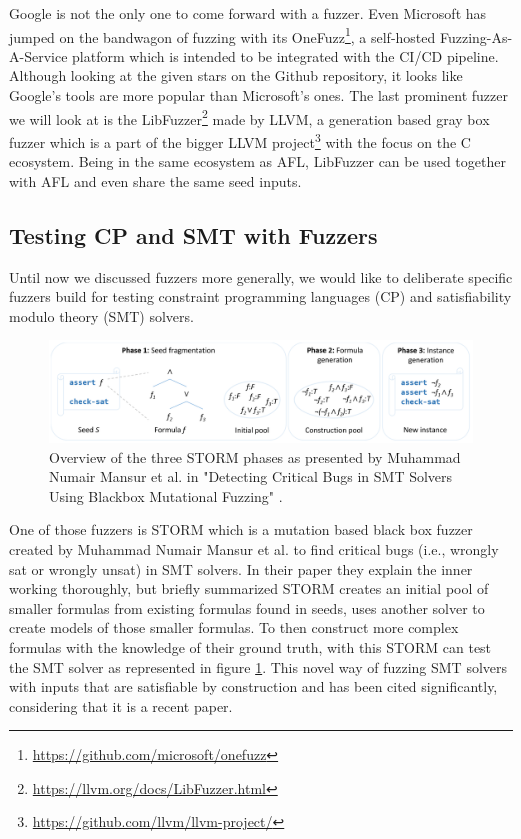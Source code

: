 Google is not the only one to come forward with a fuzzer. Even Microsoft has jumped on the bandwagon of fuzzing with its OneFuzz\footnote{\url{https://github.com/microsoft/onefuzz}}, a self-hosted Fuzzing-As-A-Service platform which is intended to be integrated with the CI/CD pipeline. Although looking at the given stars on the Github repository, it looks like Google's tools are more popular than Microsoft's ones. The last prominent fuzzer we will look at is the LibFuzzer\footnote{\url{https://llvm.org/docs/LibFuzzer.html}} made by LLVM, a generation based gray box fuzzer which is a part of the bigger LLVM project\footnote{\url{https://github.com/llvm/llvm-project/}} with the focus on the C ecosystem. Being in the same ecosystem as AFL, LibFuzzer can be used together with AFL and even share the same seed inputs.

\subsection{Testing CP and SMT with Fuzzers}
\label{fuzzing:testingWithFuzzers}
Until now we discussed fuzzers more generally, we would like to deliberate specific fuzzers build for testing constraint programming languages (CP) and satisfiability modulo theory (SMT) solvers.
\begin{figure}
	\centering
	\includegraphics[width=1.0\textwidth]{images/STORM}
	\caption{Overview of the three STORM phases as presented by Muhammad Numair Mansur et al. in "Detecting Critical Bugs in SMT Solvers Using Blackbox Mutational Fuzzing" \cite{1mansur2020detecting}.}
	\label{fig:STORM}
\end{figure}
One of those fuzzers is STORM which is a mutation based black box fuzzer created by Muhammad Numair Mansur et al. \cite{1mansur2020detecting} to find critical bugs (i.e., wrongly sat or wrongly unsat) in SMT solvers. In their paper \cite{1mansur2020detecting} they explain the inner working thoroughly, but briefly summarized STORM creates an initial pool of smaller formulas from existing formulas found in seeds, uses another solver to create models of those smaller formulas. To then construct more complex formulas with the knowledge of their ground truth, with this STORM can test the SMT solver as represented in figure \ref{fig:STORM}. This novel way of fuzzing SMT solvers with inputs that are satisfiable by construction and has been cited significantly, considering that it is a recent paper.

